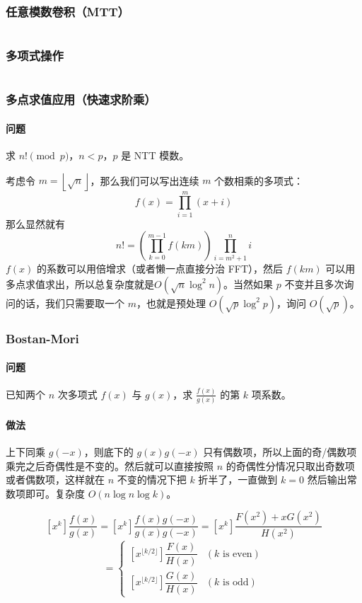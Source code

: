 \documentclass[a4paper, twoside]{article}
\begin{document}
    \subsubsection{任意模数卷积（MTT）}
    \inputminted{cpp}{../src/数学/MTT.cpp}

    \subsubsection{多项式操作}
    \inputminted{cpp}{../src/数学/多项式操作.cpp}

    \subsubsection{多点求值应用（快速求阶乘）}
    \paragraph{问题} 求 $n! \pmod p$，$n < p$，$p$ 是 NTT 模数。

    考虑令 $m = \left\lfloor \sqrt n \right\rfloor$，那么我们可以写出连续 $m$ 个数相乘的多项式：
    $$ f(x) = \prod_{i = 1} ^ m (x + i) $$
    那么显然就有
    $$ n! = \left( \prod_{k = 0} ^ {m - 1} f(k m) \right) \prod_{i = m ^ 2 + 1} ^ n i $$
    $f(x)$ 的系数可以用倍增求（或者懒一点直接分治 FFT），然后 $f(km)$ 可以用多点求值求出，所以总复杂度就是$O(\sqrt n \log^2 n)$。当然如果 $p$ 不变并且多次询问的话，我们只需要取一个 $m$，也就是预处理 $O(\sqrt p \log^2 p)$，询问 $O(\sqrt p)$。

    \subsubsection{Bostan-Mori}
    \paragraph{问题} 已知两个 $n$ 次多项式 $f(x)$ 与 $g(x)$，求 $\frac {f(x)} {g(x)}$ 的第 $k$ 项系数。

    \paragraph{做法} 上下同乘 $g(-x)$，则底下的 $g(x)g(-x)$ 只有偶数项，所以上面的奇/偶数项乘完之后奇偶性是不变的。然后就可以直接按照 $n$ 的奇偶性分情况只取出奇数项或者偶数项，这样就在 $n$ 不变的情况下把 $k$ 折半了，一直做到 $k = 0$ 然后输出常数项即可。复杂度 $O(n \log n \log k)$。

    $$ [x^k] \dfrac{f(x)}{g(x)} = [x^k] \dfrac{f(x)g(-x)}{g(x)g(-x)} = [x^k] \dfrac{F(x^2)+xG(x^2)}{H(x^2)} $$
    $$ =
    \begin{cases}
    [x^{\lfloor k/2\rfloor}]\dfrac{F(x)}{H(x)}& (k\text{ is even})\\
    [x^{\lfloor k/2\rfloor}]\dfrac{G(x)}{H(x)}& (k\text{ is odd})
    \end{cases} $$
    \inputminted{cpp}{../src/数学/Bostan-Mori.cpp}
\end{document}
